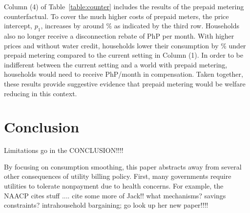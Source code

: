 \documentclass[12pt]{article}
\begin{document}
Column (4) of Table~\ref{table:counter} includes the results of the prepaid metering counterfactual.  To cover the much higher costs of prepaid meters, the price intercept, $p_1$, increases by around \unskip\% as indicated by the third row.  Households also no longer receive a disconnection rebate of PhP per month.  With higher prices and without water credit, households lower their consumption by \unskip\% under prepaid metering compared to the current setting in Column (1).  In order to be indifferent between the current setting and a world with prepaid metering, households would need to receive PhP/month in compensation.  Taken together, these results provide suggestive evidence that prepaid metering would be welfare reducing in this context.


\section{Conclusion}




Limitations go in the CONCLUSION!!!!

By focusing on consumption smoothing, this paper abstracts away from several other consequences of utility billing policy.  First, many governments require utilities to tolerate nonpayment due to health concerns.  For example, the NAACP cites stuff ....  cite some more of Jack!! what mechanisms? savings constraints?  intrahousehold bargaining; go look up her new paper!!!!






\end{document}
